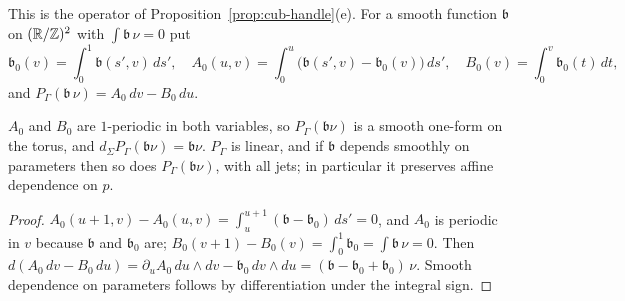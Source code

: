 \begin{definition}\label{def:fer-Pprim}
This is the operator of Proposition~\ref{prop:cub-handle}(e). For a smooth function $\mathfrak b$ on $(\mathbb{R}/\mathbb{Z})^2$ with
$\int\mathfrak b\,\nu=0$ put
\[
 \mathfrak b_0(v)=\int_0^1\mathfrak b(s',v)\,ds',\quad
 A_0(u,v)=\int_0^u\big(\mathfrak b(s',v)-\mathfrak b_0(v)\big)\,ds',\quad
 B_0(v)=\int_0^v\mathfrak b_0(t)\,dt,
\]
and $P_\Gamma(\mathfrak b\,\nu)=A_0\,dv-B_0\,du$.
\end{definition}

\begin{lemma}\label{lem:fer-Pprim}
$A_0$ and $B_0$ are $1$-periodic in both variables, so $P_\Gamma(\mathfrak b\nu)$ is a smooth one-form on the torus, and
$d_\Sigma P_\Gamma(\mathfrak b\nu)=\mathfrak b\nu$. $P_\Gamma$ is linear, and if $\mathfrak b$ depends smoothly on parameters then so does
$P_\Gamma(\mathfrak b\nu)$, with all jets; in particular it preserves affine dependence on $p$.
\end{lemma}

\begin{proof}
$A_0(u+1,v)-A_0(u,v)=\int_u^{u+1}(\mathfrak b-\mathfrak b_0)\,ds'=0$, and $A_0$ is periodic in $v$ because $\mathfrak b$ and $\mathfrak b_0$
are; $B_0(v+1)-B_0(v)=\int_0^1\mathfrak b_0=\int\mathfrak b\,\nu=0$. Then
$d(A_0\,dv-B_0\,du)=\partial_uA_0\,du\wedge dv-\mathfrak b_0\,dv\wedge du=(\mathfrak b-\mathfrak b_0+\mathfrak b_0)\,\nu$. Smooth dependence
on parameters follows by differentiation under the integral sign.
\end{proof}

